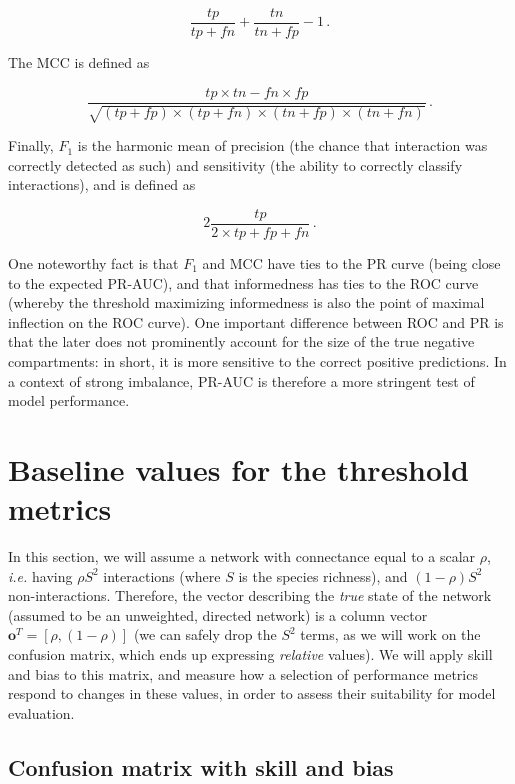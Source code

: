 \documentclass[11pt]{article}
\begin{document}
\[\frac{tp}{tp+fn}+\frac{tn}{tn+fp}-1\,.\]

The MCC is defined as

\[
\frac{tp\times tn - fn\times fp}{\sqrt{(tp+fp)\times (tp+fn)\times (tn+fp)\times (tn+fn)}} \,.
\]

Finally, \(F_1\) is the harmonic mean of precision (the chance that
interaction was correctly detected as such) and sensitivity (the ability
to correctly classify interactions), and is defined as

\[
2\frac{tp}{2\times tp + fp + fn}\,.
\]

One noteworthy fact is that \(F_1\) and MCC have ties to the PR curve
(being close to the expected PR-AUC), and that informedness has ties to
the ROC curve (whereby the threshold maximizing informedness is also the
point of maximal inflection on the ROC curve). One important difference
between ROC and PR is that the later does not prominently account for
the size of the true negative compartments: in short, it is more
sensitive to the correct positive predictions. In a context of strong
imbalance, PR-AUC is therefore a more stringent test of model
performance.

\hypertarget{baseline-values-for-the-threshold-metrics}{%
\section{Baseline values for the threshold
metrics}\label{baseline-values-for-the-threshold-metrics}}

In this section, we will assume a network with connectance equal to a
scalar \(\rho\), \emph{i.e.} having \(\rho S^2\) interactions (where
\(S\) is the species richness), and \((1-\rho) S^2\) non-interactions.
Therefore, the vector describing the \emph{true} state of the network
(assumed to be an unweighted, directed network) is a column vector
\(\mathbf{o}^T = [\rho, (1-\rho)]\) (we can safely drop the \(S^2\)
terms, as we will work on the confusion matrix, which ends up expressing
\emph{relative} values). We will apply skill and bias to this matrix,
and measure how a selection of performance metrics respond to changes in
these values, in order to assess their suitability for model evaluation.

\hypertarget{confusion-matrix-with-skill-and-bias}{%
\subsection{Confusion matrix with skill and
bias}\label{confusion-matrix-with-skill-and-bias}}
\end{document}
